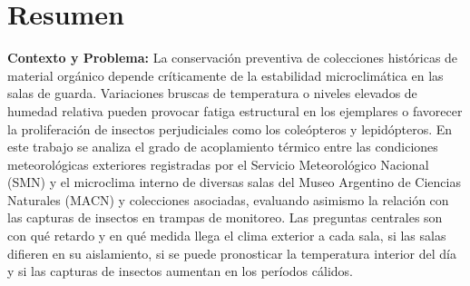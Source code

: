 \documentclass[11pt,a4paper]{article}
\begin{document}





\maketitle

\newpage
{} %

\section{Resumen}

\textbf{Contexto y Problema:} La conservación preventiva de colecciones históricas de material orgánico depende críticamente de la estabilidad microclimática en las salas de guarda. Variaciones bruscas de temperatura o niveles elevados de humedad relativa pueden provocar fatiga estructural en los ejemplares o favorecer la proliferación de insectos perjudiciales como los coleópteros y lepidópteros. En este trabajo se analiza el grado de acoplamiento térmico entre las condiciones meteorológicas exteriores registradas por el Servicio Meteorológico Nacional (SMN) y el microclima interno de diversas salas del Museo Argentino de Ciencias Naturales (MACN) y colecciones asociadas, evaluando asimismo la relación con las capturas de insectos en trampas de monitoreo. Las preguntas centrales son con qué retardo y en qué medida llega el clima exterior a cada sala, si las salas difieren en su aislamiento, si se puede pronosticar la temperatura interior del día y si las capturas de insectos aumentan en los períodos cálidos.
\end{document}
